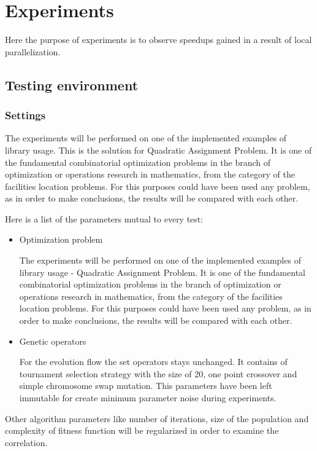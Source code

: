 \chapter{Experiments}

Here the purpose of experiments is to observe speedups gained in a result of local parallelization.

\section{Testing environment}

\subsection{Settings}

The experiments will be performed on one of the implemented examples of library usage. This is the solution for Quadratic Assignment Problem. It is one of the fundamental combinatorial optimization problems in the branch of optimization or operations research in mathematics, from the category of the facilities location problems. For this purposes could have been used any problem, as in order to make conclusions, the results will be compared with each other.

Here is a list of the parameters mutual to every test:
\begin{itemize}

\item Optimization problem

The experiments will be performed on one of the implemented examples of library usage -  Quadratic Assignment Problem. It is one of the fundamental combinatorial optimization problems in the branch of optimization or operations research in mathematics, from the category of the facilities location problems. For this purposes could have been used any problem, as in order to make conclusions, the results will be compared with each other.


\item Genetic operators

For the evolution flow the set operators stays unchanged. It contains of tournament selection strategy with the size of 20, one point crossover and simple chromosome swap mutation. This parameters have been left immutable for create minimum parameter noise during experiments.

\end{itemize}

Other algorithm parameters like number of iterations, size of the population and complexity of fitness function will be regularized in order to examine the correlation.

